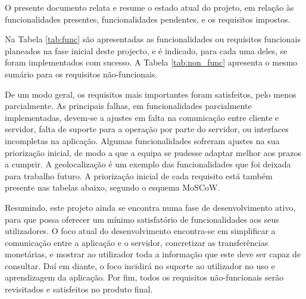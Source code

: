 O presente documento relata e resume o estado atual do projeto, em relação às funcionalidades presentes, funcionalidades pendentes, e os requisitos impostos.

Na Tabela \ref{tab:func} são apresentadas as funcionalidades ou requisitos funcionais planeados na fase inicial deste projecto, e é indicado, para cada uma deles, se foram implementados com sucesso. A Tabela \ref{tab:non_func} apresenta o mesmo sumário para os requisitos não-funcionais.

De um modo geral, os requisitos mais importantes foram satisfeitos, pelo menos parcialmente. As principais falhas, em funcionalidades parcialmente implementadas, devem-se a ajustes em falta na comunicação entre cliente e servidor, falta de suporte para a operação por parte do servidor, ou interfaces incompletas na aplicação.
Algumas funcionalidades sofreram ajustes na sua priorização inicial, de modo a que a equipa se pudesse adaptar melhor aos prazos a cumprir. A geolocalização é um exemplo das funcionalidades que foi deixada para trabalho futuro. A priorização inicial de cada requisito está também presente nas tabelas abaixo, segundo o esquema MoSCoW.

Resumindo, este projeto ainda se encontra numa fase de desenvolvimento ativo, para que possa oferecer um mínimo satisfatório de funcionalidades aos seus utilizadores. O foco atual do desenvolvimento encontra-se em simplificar a comunicação entre a aplicação e o servidor, concretizar as transferências monetárias, e mostrar ao utilizador toda a informação que este deve ser capaz de consultar. Daí em diante, o foco incidirá no suporte ao utilizador no uso e aprendizagem da aplicação. Por fim, todos os requisitos não-funcionais serão revisitados e satisfeitos no produto final.

